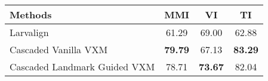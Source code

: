 \begin{tabular}{lccc}
\hline
 ﻿Methods  & MMI   & VI    & TI    \\ \hline \hline
 Larvalign & 61.29 & 69.00 & 62.88 \\
 Cascaded Vanilla VXM  & \textbf{79.79}  & 67.13 & \textbf{83.29} \\
 Cascaded Landmark Guided VXM  & 78.71 & \textbf{73.67} & 82.04 \\
\hline
\end{tabular}